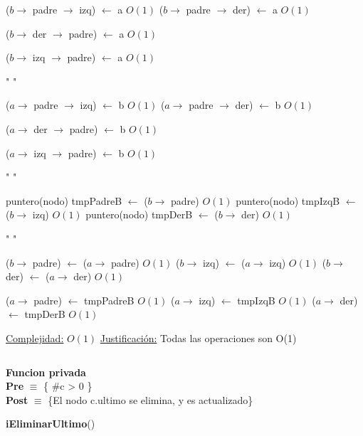 \begin{Algoritmos}
\begin{algorithm}[H]
\begin{algorithmic}[1]
        \State ($b \to$ padre $\to$ izq) $\gets$ a \Comment $O(1)$
    \Else {}
        \State ($b \to$ padre $\to$ der) $\gets$ a \Comment $O(1)$
    \EndIf
    \EndIf

        \State ($b \to$ der $\to$ padre) $\gets$ a \Comment $O(1)$
    \EndIf

        \State ($b \to$ izq $\to$ padre) $\gets$ a \Comment $O(1)$
    \EndIf

    \State " "

        \State ($a \to$ padre $\to$ izq) $\gets$ b \Comment $O(1)$
    \Else {}
        \State ($a \to$ padre $\to$ der) $\gets$ b \Comment $O(1)$
    \EndIf
    \EndIf

        \State ($a \to$ der $\to$ padre) $\gets$ b \Comment $O(1)$
    \EndIf

        \State ($a \to$ izq $\to$ padre) $\gets$ b \Comment $O(1)$
    \EndIf

    \State " "

    \State puntero(nodo) tmpPadreB $\gets$ ($b \to$ padre) \Comment $O(1)$
    \State puntero(nodo) tmpIzqB $\gets$ ($b \to$ izq) \Comment $O(1)$
    \State puntero(nodo) tmpDerB $\gets$ ($b \to$ der) \Comment $O(1)$

    \State " "

    \State ($b \to$ padre) $\gets$ ($a \to$ padre) \Comment $O(1)$
    \State ($b \to$ izq) $\gets$ ($a \to$ izq) \Comment $O(1)$
    \State ($b \to$ der) $\gets$ ($a \to$ der) \Comment $O(1)$

    \State ($a \to$ padre) $\gets$ tmpPadreB \Comment $O(1)$
    \State ($a \to$ izq) $\gets$ tmpIzqB \Comment $O(1)$
    \State ($a \to$ der) $\gets$ tmpDerB \Comment $O(1)$


    \medskip
    \Statex \underline{Complejidad:} $O(1)$
    \Statex \underline{Justificaci\'on:} Todas las operaciones son O(1)

\end{algorithmic}
\end{algorithm}

$ $\newline

\textbf{Funcion privada}\\
\textbf{Pre} $\equiv$ \{ $\#$c > 0 \}\\%
\textbf{Post} $\equiv$ \{El nodo c.ultimo se elimina, y es actualizado\}%
\begin{algorithm}[H]
{\textbf{iEliminarUltimo}()}
\begin{algorithmic}[1]


\end{algorithmic}
\end{algorithm}
\end{Algoritmos}
